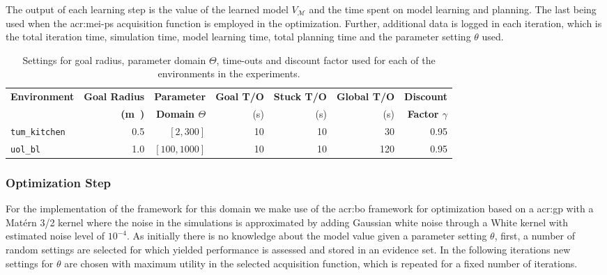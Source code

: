 The output of each learning step is the value of the learned model $V_\mathcal{M}$ and the time spent on model learning and planning.
The last being used when the \acrshort{acr:mei-ps} acquisition function is employed in the optimization.
Further, additional data is logged in each iteration, which is the total iteration time, simulation time, model learning time, total planning time and the parameter setting $\theta$ used.


\begin{table}
	\caption{Settings for goal radius, parameter domain $\Theta$, time-outs and discount factor used for each of the environments in the experiments.}
	\label{tab:designer-settings}\centering
	\begin{tabular}{|l|r|r|r|r|r|r|}
		\hline
		\textbf{Environment} & \textbf{Goal Radius} & \textbf{Parameter} & \textbf{Goal T/O} & \textbf{Stuck T/O} & \textbf{Global T/O} & \textbf{Discount}  \\
		
		& \textbf{(\si\meter)} & \textbf{Domain $\Theta$} & (\si{\second}) & (\si{\second}) & (\si{\second}) & \textbf{Factor $\gamma$}\\
		\hline
		\texttt{tum\_kitchen} & \num{0.5} & $[2, 300]$ & \num{10} & \num{10} & \num{30} & \num{0.95} \\
		\hline
		\texttt{uol\_bl} & \num{1.0} & $[100, 1000]$ & \num{10} & \num{10} & \num{120} & \num{0.95}\\
		\hline
	\end{tabular}
\end{table}

\subsubsection{Optimization Step}

For the implementation of the framework for this domain we make use of the \acrshort{acr:bo} framework for optimization based on a \acrshort{acr:gp} with a Mat\'ern 3/2 kernel where the noise in the simulations is approximated by adding Gaussian white noise through a White kernel with estimated noise level of $10^{-4}$.
As initially there is no knowledge about the model value given a parameter setting $\theta$, first, a number of random settings are selected for which yielded performance is assessed and stored in an evidence set.
In the following iterations new settings for $\theta$ are chosen with maximum utility in the selected acquisition function, which is repeated for a fixed number of iterations.

